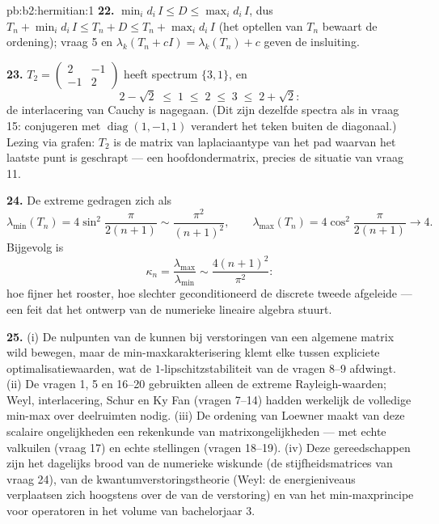 \begin{solution}{pb:b2:hermitian:1}
\textbf{22.} $\min_id_i\,I \leq D \leq \max_id_i\,I$, dus $T_n +
\min_id_i\,I \leq T_n + D \leq T_n + \max_id_i\,I$ (het optellen
van $T_n$ bewaart de ordening); vraag 5 en $\lambda_k(T_n + cI) =
\lambda_k(T_n) + c$ geven de insluiting.

\textbf{23.} $T_2 = \begin{pmatrix} 2 & -1\\ -1 &
2\end{pmatrix}$ heeft spectrum $\{3, 1\}$, en
\[
2 - \sqrt2 \;\leq\; 1 \;\leq\; 2 \;\leq\; 3 \;\leq\; 2 +
\sqrt2 :
\]
de interlacering van Cauchy is nagegaan. (Dit zijn dezelfde spectra
als in vraag 15: conjugeren met $\operatorname{diag}(1,-1,1)$
verandert het teken buiten de diagonaal.) Lezing via grafen: $T_2$
is de matrix van laplaciaantype van het pad waarvan het laatste
punt is geschrapt --- een hoofdondermatrix, precies de situatie van
vraag 11.

\textbf{24.} De extreme  gedragen zich als
\[
\lambda_{\min}(T_n) = 4\sin^2\frac{\pi}{2(n+1)}
\sim \frac{\pi^2}{(n+1)^2},
\qquad
\lambda_{\max}(T_n) = 4\cos^2\frac{\pi}{2(n+1)}
\longrightarrow 4 .
\]
Bijgevolg is
\[
\kappa_n = \frac{\lambda_{\max}}{\lambda_{\min}}
\sim \frac{4(n+1)^2}{\pi^2} :
\]
hoe fijner het rooster, hoe slechter geconditioneerd de discrete
tweede afgeleide --- een feit dat het ontwerp van de numerieke
lineaire algebra stuurt.

\textbf{25.} (i) De nulpunten van de 
kunnen bij verstoringen van een algemene matrix wild bewegen, maar
de min-maxkarakterisering klemt elke   tussen
expliciete optimalisatiewaarden, wat de $1$-lipschitzstabiliteit
van de vragen 8--9 afdwingt. (ii) De vragen 1, 5 en 16--20
gebruikten alleen de extreme Rayleigh-waarden; Weyl, interlacering,
Schur en Ky Fan (vragen 7--14) hadden werkelijk de volledige
min-max over deelruimten nodig. (iii) De ordening van Loewner maakt
van deze scalaire ongelijkheden een rekenkunde van
matrixongelijkheden --- met echte valkuilen (vraag 17) en echte
stellingen (vragen 18--19). (iv) Deze gereedschappen zijn het
dagelijks brood van de numerieke wiskunde (de stijfheidsmatrices
van vraag 24), van de kwantumverstoringstheorie (Weyl: de
energieniveaus verplaatsen zich hoogstens over de  van de
verstoring) en van het min-maxprincipe voor 
 operatoren in het volume van bachelorjaar 3.
\end{solution}
